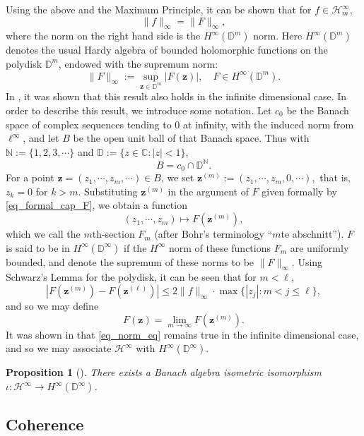 \documentclass[11pt,reqno]{amsart}
\numberwithin{equation}{section}
\newtheorem{proposition}[theorem]{Proposition}
\theoremstyle{definition}
\theoremstyle{definition}
\theoremstyle{definition}
\begin{document}
\noindent Using the above and the Maximum Principle, it can be shown that for $f\in
\mathscr{H}^\infty_m$,
\begin{equation}
 \label{eq_norm_eq}
 \|f\|_\infty =\|F\|_\infty,
\end{equation}
where the norm on the right hand side is the $H^\infty({\mathbb{D}}^m)$
norm. Here $H^\infty({\mathbb{D}}^m)$ denotes the usual Hardy algebra of
bounded holomorphic functions on the polydisk ${\mathbb{D}}^m$, endowed with
the supremum norm:
$$
\|F\|_\infty :=\sup_{\mathbf{z}\in {\mathbb{D}}^m}|F(\mathbf{z})|,\quad F\in H^\infty({\mathbb{D}}^m).
$$
In \cite{HedLinSei}, it was shown that this result also holds in the infinite dimensional
case.  In order to describe this
result, we introduce some notation. Let $c_0$ be the Banach space of
complex sequences tending to $0$ at infinity, with the induced norm
from $\ell^\infty$, and let $B$ be the open unit ball of that Banach
space.  Thus with ${\mathbb{N}}:=\{1,2,3,\cdots\}$ and ${\mathbb{D}}:=\{z\in
{\mathbb{C}}:|z|<1\}$,
$$
B=c_0\cap {\mathbb{D}}^{\mathbb{N}}.
$$
For a point  $\mathbf{z}=(z_1,\cdots, z_m,\cdots)\in B$, we set 
 $
\mathbf{z}^{(m)}:=(z_1,\cdots, z_m,0,\cdots),
$ 
that is, $z_k=0$ for $k>m$. Substituting $\mathbf{z}^{(m)}$ in the
argument of $F$ given formally by \eqref{eq_formal_cap_F},  
we obtain a function
$$
(z_1,\cdots,z_m)\mapsto F(\mathbf{z}^{(m)}),
$$
which we call the $m$th-section $F_m$ (after Bohr's terminology
``$m$te abschnitt''). $F$ is said to be in $H^\infty ({\mathbb{D}}^\infty)$ if
the $H^\infty$ norm of these functions $F_m$ are uniformly bounded,
and denote the supremum of these norms to be $\|F\|_\infty$. Using
Schwarz's Lemma for the polydisk, it can be seen that for $m<\ell$,
$$
|F(\mathbf{z}^{(m)})-F(\mathbf{z}^{(\ell)})|\leq 
2 \|f\|_\infty \cdot \max\{|z_j|:m<j\leq \ell\},
$$
and so we may define 
$$
F(\mathbf{z})=\lim_{m\rightarrow \infty} F(\mathbf{z}^{(m)}).
$$
It was shown in \cite{HedLinSei} that \eqref{eq_norm_eq} remains true
in the infinite dimensional case, and so we may associate ${{{\mathscr{H}}^{\infty}}}$ with
$H^\infty({\mathbb{D}}^\infty)$.

\begin{proposition}[\cite{HedLinSei}]
  There exists a Banach algebra isometric isomorphism $\iota :
  {{{\mathscr{H}}^{\infty}}}\rightarrow H^\infty({\mathbb{D}}^\infty)$.
\end{proposition}

\subsection{Coherence}
\end{document}
